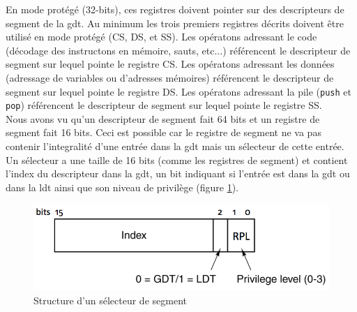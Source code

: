\documentclass[a4paper, 12pt]{article}
\begin{document}
\begin{center}
\end{center}

En mode protégé (32-bits), ces registres doivent pointer sur des descripteurs
de segment de la \acrshort{gdt}. Au minimum les trois premiers registres décrits
doivent être utilisé en mode protégé (CS, DS, et SS). Les opératons adressant le
code (décodage des instructons en mémoire, sauts, etc...) référencent le descripteur
de segment sur lequel pointe le registre CS. Les opératons adressant les données
(adressage de variables ou d'adresses mémoires) référencent le descripteur de segment
sur lequel pointe le registre DS. Les opératons adressant la pile (\texttt{push}
et \texttt{pop}) référencent le descripteur de segment sur lequel pointe
le registre SS. \\

Nous avons vu qu'un descripteur de segment fait 64 bits et un registre de segment
fait 16 bits. Ceci est possible car le registre de segment ne va pas contenir
l'integralité d'une entrée dans la \acrshort{gdt} mais un sélecteur de cette entrée.
Un sélecteur a une taille de 16 bits (comme les registres de segment) et contient
l'index du descripteur dans la \acrshort{gdt}, un bit indiquant si l'entrée est
dans la \acrshort{gdt} ou dans la \acrshort{ldt} ainsi que son niveau de privilège
(figure \ref{seg_sel}).\cite{ref42}

\begin{figure}[!h]
  \centering
  \includegraphics[scale=0.75]{images/seg_sel.png}
  \caption{Structure d'un sélecteur de segment}
  \label{seg_sel}
\end{figure}
\end{document}
